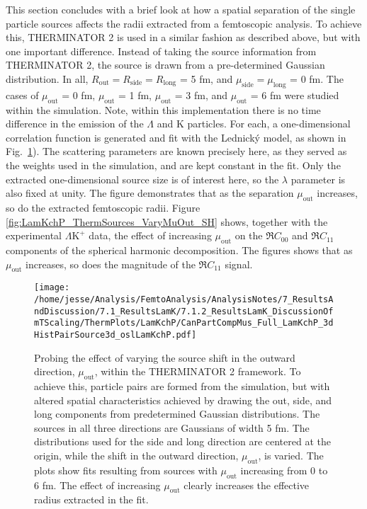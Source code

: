 \documentclass[ALICE,manyauthors]{cernphprep}
\newcommand{\Lam}{$\Lambda$\xspace}
\newcommand{\LamKchP}{$\Lambda\mathrm{K^{+}}$\xspace}
\begin{document}
This section concludes with a brief look at how a spatial separation of the single particle sources affects the radii extracted from a femtoscopic analysis.
To achieve this, THERMINATOR 2 is used in a similar fashion as described above, but with one important difference.
Instead of taking the source information from THERMINATOR 2, the source is drawn from a pre-determined Gaussian distribution.
In all, $R_{\mathrm{out}} = R_{\mathrm{side}} = R_{\mathrm{long}}$ = 5 fm, and $\mu_{\mathrm{side}} = \mu_{\mathrm{long}}$ = 0 fm.
The cases of $\mu_{\mathrm{out}}$ = 0 fm, $\mu_{\mathrm{out}}$ = 1 fm, $\mu_{\mathrm{out}}$ = 3 fm, and $\mu_{\mathrm{out}}$ = 6 fm were studied within the simulation.
Note, within this implementation there is no time difference in the emission of the \Lam and K particles.
For each, a one-dimensional correlation function is generated and fit with the Lednick\'y model, as shown in Fig.\ \ref{fig:LamKchP_ThermSources_VaryMuOut}).
The scattering parameters are known precisely here, as they served as the weights used in the simulation, and are kept constant in the fit.
Only the extracted one-dimensional source size is of interest here, so the $\lambda$ parameter is also fixed at unity.
The figure demonstrates that as the separation $\mu_{\mathrm{out}}$ increases, so do the extracted femtoscopic radii.
Figure \ref{fig:LamKchP_ThermSources_VaryMuOut_SH} shows, together with the experimental \LamKchP data, the effect of increasing $\mu_{\mathrm{out}}$ on the $\Re C_{00}$ and $\Re C_{11}$ components of the spherical harmonic decomposition.
The figures shows that as $\mu_{\mathrm{out}}$ increases, so does the magnitude of the $\Re C_{11}$ signal.





\begin{figure}[h]
  \centering
  \texttt{[image: /home/jesse/Analysis/FemtoAnalysis/AnalysisNotes/7\_ResultsAndDiscussion/7.1\_ResultsLamK/7.1.2\_ResultsLamK\_DiscussionOfmTScaling/ThermPlots/LamKchP/CanPartCompMus\_Full\_LamKchP\_3dHistPairSource3d\_oslLamKchP.pdf]}
  \caption[Varying $\mu_{\mathrm{Out}}$ with THERMINATOR 2]
  {
  {\color{blue}{UPDATED FIGURE}}
  Probing the effect of varying the source shift in the outward direction, $\mu_{\mathrm{out}}$, within the THERMINATOR 2 framework.  
  To achieve this, particle pairs are formed from the simulation, but with altered spatial characteristics achieved by drawing the out, side, and long components from predetermined Gaussian distributions.  
  The sources in all three directions are Gaussians of width 5 fm.
  The distributions used for the side and long direction are centered at the origin, while the shift in the outward direction, $\mu_{\mathrm{out}}$, is varied.
  The plots show fits resulting from sources with $\mu_{\mathrm{out}}$ increasing from 0 to 6 fm. 
  The effect of increasing $\mu_{\mathrm{out}}$ clearly increases the effective radius extracted in the fit.
  }
  \label{fig:LamKchP_ThermSources_VaryMuOut}
\end{figure}
\end{document}
